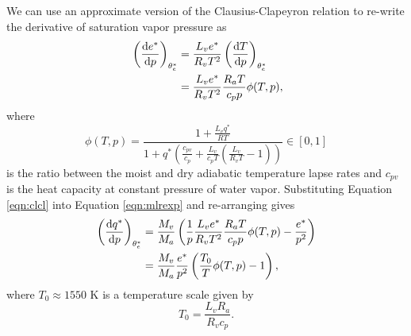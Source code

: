 \documentclass[twocol]{ametsoc}
\begin{document}
We can use an approximate version of the Clausius-Clapeyron relation \citep[][]{Pierrehumbert2010PrinciplesClimate} to re-write the derivative of saturation vapor pressure as
\begin{equation} \label{eqn:clcl}
\begin{split}
\    	\left(\frac{{\rm d}e^*}{{\rm d}p}\right)_{\theta_e^*} &= \frac{L_v e^*}{R_v T^2} \left(\frac{{\rm d}T}{{\rm d}p}\right)_{\theta_e^*} \\
	&= \frac{L_v e^*}{R_v T^2} \frac{R_a T}{c_p p} \phi(T,p),
\end{split}
\end{equation}
where 
\begin{equation}
    \phi(T,p) = \frac{1 + \frac{L_v q^*}{R T}}{1 + q^* \left (\frac{c_{pv}}{c_p} + \frac{L_v}{c_p T}\left( \frac{L_v}{R_v T} - 1\right) \right)} \in [0,1]
\end{equation}
is the ratio between the moist and dry adiabatic temperature lapse rates \citep[e.g.][]{Pierrehumbert2010PrinciplesClimate} and $c_{pv}$ is the heat capacity at constant pressure of water vapor. Substituting Equation \ref{eqn:clcl} into Equation \ref{eqn:mlrexp} and re-arranging gives
\begin{equation} \label{eqn:mlr}
\begin{split}
	\left(\frac{{\rm d}q^*}{{\rm d}p}\right)_{\theta_e^*} &= \frac{M_v}{M_a} \left ( \frac{1}{p} \frac{L_v e^*}{R_v T^2} \frac{R_a T}{c_p p} \phi(T,p) - \frac{e^*}{p^2} \right ) \\
	&= \frac{M_v}{M_a} \frac{e^*}{p^2} \left ( \frac{T_0}{T} \phi(T,p) - 1 \right ),
\end{split}
\end{equation}
where $T_0 \approx 1550$ K is a temperature scale given by
\begin{equation}
T_0 = \frac{L_v R_a}{R_v c_p}.
\end{equation}
\end{document}
